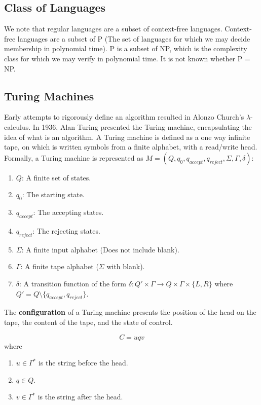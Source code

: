 \documentclass[11pt]{article}
\theoremstyle{plain} %
\theoremstyle{definition}
\theoremstyle{example}
\theoremstyle{remark}
\begin{document}
\subsection{Class of Languages}

We note that regular languages are a subset of context-free languages. Context-free languages are a subset of P (The set of languages for which we may decide membership in polynomial time). P is a subset of NP, which is the complexity class for which we may verify in polynomial time. It is not known whether P = NP. 

\subsection{Turing Machines}

Early attempts to rigorously define an algorithm resulted in Alonzo Church's $\lambda$-calculus. In 1936, Alan Turing presented the Turing machine, encapsulating the idea of what is an algorithm. A Turing machine is defined as a one way infinite tape, on which is written symbols from a finite alphabet, with a read/write head. Formally, a Turing machine is represented as $M=(Q, q_0, q_{accept}, q_{reject}, \Sigma, \Gamma, \delta)$:

\begin{enumerate}
	\item $Q$: A finite set of states.
	\item $q_0$: The starting state.
	\item $q_{accept}$: The accepting states.
	\item $q_{reject}$: The rejecting states.
	\item $\Sigma$: A finite input alphabet (Does not include blank).
	\item $\Gamma$:  A finite tape alphabet ($\Sigma$ with blank).
	\item $\delta$: A transition function of the form $\delta: Q' \times \Gamma \rightarrow Q \times \Gamma \times \{L,R\}$ where $Q' = Q\setminus \{q_{accept}, q_{reject}\}$.
\end{enumerate}

The \textbf{configuration} of a Turing machine presents the position of the head on the tape, the content of the tape, and the state of control. 

$$C = uqv$$ where

\begin{enumerate}
	\item $u \in \Gamma^*$ is the string before the head.
	\item $q \in Q$.
	\item $v \in \Gamma^*$ is the string after the head.
\end{enumerate}
\end{document}
